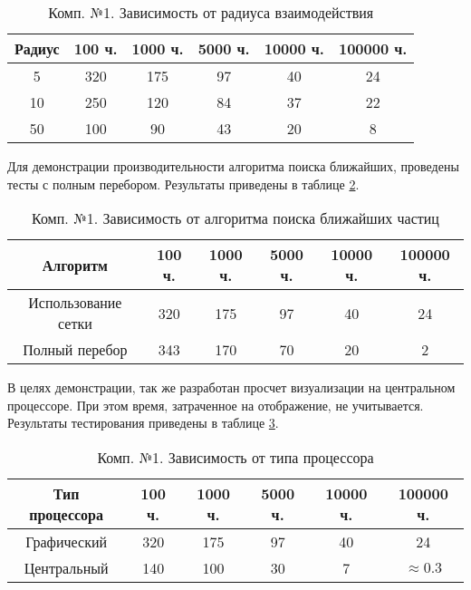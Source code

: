 \begin{table}[H]
  \caption{\label{tab:fst:radius}Комп. №1. Зависимость от радиуса взаимодействия}
  \begin{center}
    \begin{tabular}{|c|c|c|c|c|c|}
      \hline
      Радиус & 100 ч. & 1000 ч. & 5000 ч. & 10000 ч. & 100000 ч. \\
      \hline
      5 & 320 & 175 & 97 & 40 & 24 \\
      10 & 250 & 120 & 84 & 37 & 22 \\
      50 & 100 & 90 & 43 & 20 & 8 \\
      \hline
    \end{tabular}
  \end{center}
\end{table}

Для демонстрации производительности алгоритма поиска ближайших, проведены
тесты с полным перебором. Результаты приведены в таблице \ref{tab:fst:algorithm}.

\begin{table}[H]
  \caption{\label{tab:fst:algorithm}Комп. №1. Зависимость от алгоритма поиска ближайших частиц}
  \begin{center}
    \begin{tabular}{|c|c|c|c|c|c|}
      \hline
      Алгоритм & 100 ч. & 1000 ч. & 5000 ч. & 10000 ч. & 100000 ч. \\
      \hline
      Использование сетки & 320 & 175 & 97 & 40 & 24 \\
      Полный перебор & 343 & 170 & 70 & 20 & 2 \\
      \hline
    \end{tabular}
  \end{center}
\end{table}

В целях демонстрации, так же разработан просчет визуализации на центральном процессоре.
При этом время, затраченное на отображение, не учитывается. Результаты тестирования 
приведены в таблице \ref{tab:fst:cpu}.  \\

\begin{table}[H] 
  \caption{\label{tab:fst:cpu}Комп. №1. Зависимость от типа процессора} 
  \begin{center} 
    \begin{tabular}{|c|c|c|c|c|c|} 
      \hline
      Тип процессора & 100 ч. & 1000 ч. & 5000 ч. & 10000 ч. & 100000 ч. \\
      \hline
      Графический & 320 & 175 & 97 & 40 & 24 \\
      Центральный & 140 & 100 & 30 & 7 & $\approx{}0.3$ \\
      \hline
    \end{tabular} 
  \end{center} 
\end{table} 

